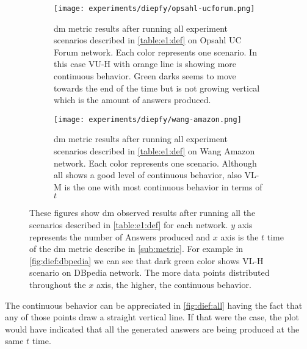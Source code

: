 \begin{figure}[!htp]
  \begin{subfigure}[t]{0.45\textwidth}
   \texttt{[image: experiments/diepfy/opsahl-ucforum.png]}
    \caption[{[EE] \acrshort{dm} Results: Opsahl UC Forum}]{\acrshort{dm} metric results after running all experiment scenarios described in \autoref{table:e1:def} on Opsahl UC Forum network. Each color represents one scenario. In this case VU-H with orange line is showing more continuous behavior. Green darks seems to move towards the end of the time but is not growing vertical which is the amount of answers produced.}
    \label{fig:dief:opsahl}
  \end{subfigure}\hfill
  \begin{subfigure}[t]{0.45\textwidth}
    \texttt{[image: experiments/diepfy/wang-amazon.png]}
     \caption[{[EE] \acrshort{dm} Results: Wang Amazon}]{\acrshort{dm} metric results after running all experiment scenarios described in \autoref{table:e1:def} on Wang Amazon network. Each color represents one scenario. Although all shows a good level of continuous behavior, also VL-M is the one with most continuous behavior in terms of $t$}
     \label{fig:dief:wang}
   \end{subfigure}
   \caption[{[EE] \acrshort{dm} General Results}]{These figures show \acrshort{dm} observed results after running all the scenarios described in \autoref{table:e1:def} for each network. $y$ axis represents the number of Answers produced and $x$ axis is the $t$ time of the \acrshort{dm} metric describe in \autoref{sub:metric}. For example in \autoref{fig:dief:dbpedia} we can see that dark green color shows VL-H scenario on DBpedia network. The more data points distributed throughout the $x$ axis, the higher, the continuous behavior.}
   \label{fig:dief:all}
 \end{figure}

The continuous behavior can be appreciated in \autoref{fig:dief:all} having the fact that any of those points draw a straight vertical line. 
If that were the case, the plot would have indicated that all the generated answers are being produced at the same $t$ time.


